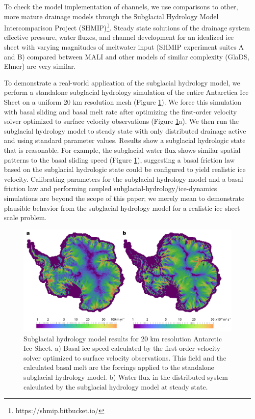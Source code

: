 To check the model implementation of channels, we use comparisons to other, more mature drainage models
through the Subglacial Hydrology Model Intercomparison Project (SHMIP)\footnote{https://shmip.bitbucket.io/}.
Steady state solutions of the drainage system effective pressure, water fluxes, and channel development
for an idealized ice sheet with varying magnitudes of meltwater input (SHMIP experiment suites A and B)
compared between MALI and other models of similar complexity (GlaDS, Elmer) are very similar.

To demonstrate a real-world application of the subglacial hydrology model,
we perform a standalone subglacial hydrology simulation of the entire Antarctica Ice Sheet on a uniform 20 km resolution mesh (Figure \ref{fig:sgh:aisflux}).
We force this simulation with basal sliding and basal melt rate after optimizing the first-order velocity solver optimized to surface velocity observations (Figure \ref{fig:sgh:aisflux}a).
We then run the subglacial hydrology model to steady state with only distributed drainage active and using standard parameter values.
Results show a subglacial hydrologic state that is reasonable.
For example, the subglacial water flux shows similar spatial patterns to the basal sliding speed (Figure \ref{fig:sgh:aisflux}),
suggesting a basal friction law based on the subglacial hydrologic state could be configured to 
yield realistic ice velocity.
Calibrating parameters for the subglacial hydrology model and a basal friction law
and performing coupled subglacial-hydrology/ice-dynamics simulations are beyond the scope of this paper;
we merely mean to demonstrate plausible behavior from the subglacial hydrology model for a realistic ice-sheet-scale problem.

\begin{figure}[t]
\centering
\includegraphics[width=15.3cm]{landice/figures/speed_vs_hydroflux_clean.png}
\caption{Subglacial hydrology model results for 20 km resolution Antarctic Ice Sheet. 
a) Basal ice speed calculated by the first-order velocity solver optimized to surface velocity observations.  This field and the calculated basal melt are the forcings applied to the standalone subglacial hydrology model.
b) Water flux  in the distributed system calculated by the subglacial hydrology model at steady state.
}
\label{fig:sgh:aisflux}
\end{figure}


